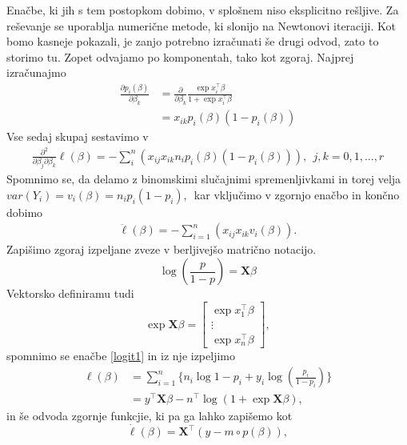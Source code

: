 \documentclass[12pt,a4paper]{amsart}
\theoremstyle{definition} %
\theoremstyle{plain} %
\begin{document}
Enačbe, ki jih s tem postopkom dobimo, v splošnem niso eksplicitno rešljive. Za reševanje se uporablja numerične metode, ki slonijo na Newtonovi iteraciji. Kot
bomo kasneje pokazali, je zanjo potrebno izračunati še drugi odvod, zato to storimo tu. Zopet odvajamo po komponentah, tako kot zgoraj. Najprej izračunajmo
\begin{align}
    \frac{\partial p_{i}(\beta)}{\partial \beta_{k}} &= \frac{\partial}{\partial \beta_{k}} \frac{\exp{x_{i}^\top\beta}}{1+\exp{x_{i}^\top\beta}} \nonumber \\
        &= x_{ik}p_{i}(\beta)(1 - p_{i}(\beta)) \nonumber
\end{align}
Vse sedaj skupaj sestavimo v
\begin{align}
    \frac{\partial^2}{\partial \beta_{j}\partial\beta_{k}} \ell(\beta)= - \sum_{i}^{n}\left(x_{ij}x_{ik}n_{i}p_{i}(\beta)(1-p_{i}(\beta))\right),~~j,k = 0,1,\ldots, r
\end{align}
Spomnimo se, da delamo z binomskimi slučajnimi spremenljivkami in torej velja $var(Y_{i}) = v_{i}(\beta) = n_{i}p_{i}(1-p_{i}),$~kar vključimo v zgornjo enačbo in končno dobimo
\begin{align}
    \ddot{\ell}(\beta) = -\sum_{i=1}^{n}\left(x_{ij}x_{ik}v_{i}(\beta)\right).
\end{align}
Zapišimo zgoraj izpeljane zveze v berljivejšo matrično notacijo. 
\begin{equation*}
    \log \left(\frac{p}{1-p}\right) = \mathbf{X}\beta
\end{equation*}
Vektorsko definiramu tudi
\[
    \exp{\mathbf{X}\beta} = \begin{bmatrix}
                            \exp{x_{1}^\top\beta} \\
                            \vdots\\
                            \exp{x_{n}^\top\beta}
                            \end{bmatrix},
\]
spomnimo se enačbe \eqref{logit1} in iz nje izpeljimo %
\begin{align} \label{ell}
    \ell(\beta) &= \sum_{i=1}^{n}\{n_{i}\log{1-p_{i}}  + y_{i}\log{\left(\frac{p_{i}}{1-p_{i}}\right)}\} \nonumber\\
    &= y^\top\mathbf{X}\beta - n^\top \log(1 + \exp{\mathbf{X}\beta}),
\end{align}
in še odvoda zgornje funkcjie, ki pa ga lahko zapišemo kot
\begin{equation}
    \dot{\ell}(\beta) = \mathbf{X}^\top(y - m\circ p(\beta)),
\end{equation}
\end{document}
